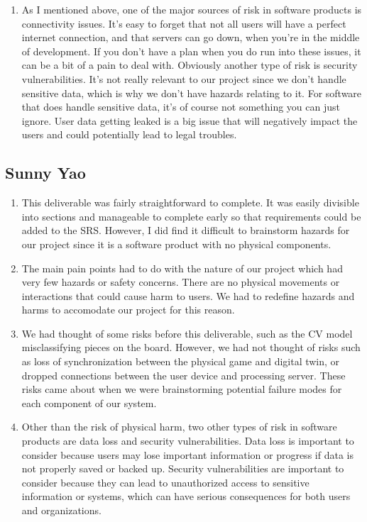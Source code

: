 \documentclass{article}
\begin{document}
\begin{enumerate}
    \item As I mentioned above, one of the major sources of risk in software products is connectivity issues.
    It's easy to forget that not all users will have a perfect internet connection, and that servers can go down, when you're in the middle of development.
    If you don't have a plan when you do run into these issues, it can be a bit of a pain to deal with.
    Obviously another type of risk is security vulnerabilities.
    It's not really relevant to our project since we don't handle sensitive data, which is why we don't have hazards relating to it.
    For software that does handle sensitive data, it's of course not something you can just ignore.
    User data getting leaked is a big issue that will negatively impact the users and could potentially lead to legal troubles.
\end{enumerate}

\subsection*{Sunny Yao}\label{subsec:sunny-yao-reflection}
\begin{enumerate}
    \item This deliverable was fairly straightforward to complete. It was easily
    divisible into sections and manageable to complete early so that requirements
    could be added to the SRS. However, I did find it difficult to
    brainstorm hazards for our project since it is a software product with no
    physical components.

    \item The main pain points had to do with the nature of our project which had 
    very few hazards or safety concerns. There are no physical movements or
    interactions that could cause harm to users. We had to redefine hazards 
    and harms to accomodate our project for this reason.

    \item We had thought of some risks before this deliverable, such as the CV model
    misclassifying pieces on the board. However, we had not thought of risks
    such as loss of synchronization between the physical game and digital twin,
    or dropped connections between the user device and processing server. These
    risks came about when we were brainstorming potential failure modes for
    each component of our system.

    \item Other than the risk of physical harm, two other types of risk in
    software products are data loss and security vulnerabilities. Data loss is
    important to consider because users may lose important information or
    progress if data is not properly saved or backed up. Security
    vulnerabilities are important to consider because they can lead to
    unauthorized access to sensitive information or systems, which can have
    serious consequences for both users and organizations.
\end{enumerate}
\end{document}
